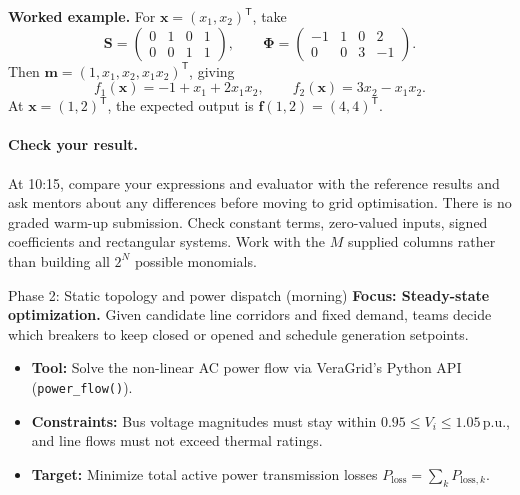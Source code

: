 \documentclass[11pt,a4paper]{article}
\begin{document}
\textbf{Worked example.} For $\mathbf x=(x_1,x_2)^\mathsf T$, take
\[
 \mathbf{S}=\begin{pmatrix}0&1&0&1\\0&0&1&1\end{pmatrix},\qquad
 \boldsymbol{\Phi}=\begin{pmatrix}-1&1&0&2\\0&0&3&-1\end{pmatrix}.
\]
Then $\mathbf m=(1,x_1,x_2,x_1x_2)^\mathsf T$, giving
\[
 \boxed{\quad f_1(\mathbf x)=-1+x_1+2x_1x_2,\qquad
 f_2(\mathbf x)=3x_2-x_1x_2.\quad}
\]
At $\mathbf x=(1,2)^\mathsf T$, the expected output is $\mathbf f(1,2)=(4,4)^\mathsf T$.

\paragraph{Check your result.}
At 10:15, compare your expressions and evaluator with the reference results and
ask mentors about any differences before moving to grid optimisation. There is
no graded warm-up submission. Check constant terms, zero-valued inputs, signed
coefficients and rectangular systems. Work with the $M$ supplied columns rather than
building all $2^N$ possible monomials.

\begin{challengebox}{Phase 2: Static topology and power dispatch (morning)}
  \textbf{Focus: Steady-state optimization.} Given candidate line corridors and fixed demand, teams decide which breakers to keep closed or opened and schedule generation setpoints.
  \begin{itemize}[leftmargin=*, itemsep=1pt]
    \item \textbf{Tool:} Solve the non-linear AC power flow via VeraGrid's Python API (\texttt{power\_flow()}).
    \item \textbf{Constraints:} Bus voltage magnitudes must stay within $0.95 \le V_i \le 1.05\,\text{p.u.}$, and line flows must not exceed thermal ratings.
    \item \textbf{Target:} Minimize total active power transmission losses $P_{\text{loss}} = \sum_{k} P_{\text{loss}, k}$.
  \end{itemize}
\end{challengebox}
\end{document}
